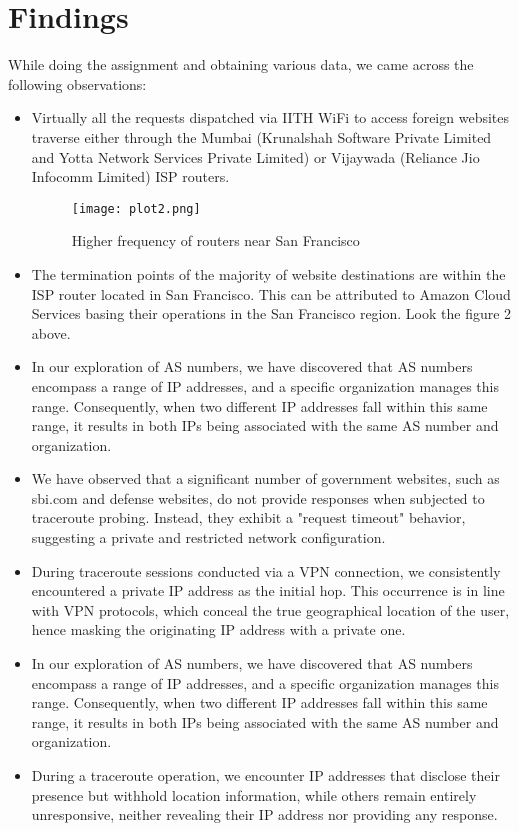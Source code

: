 \documentclass{article}
\begin{document}
\section{Findings}
While doing the assignment and obtaining various data, we came across the following observations:
\begin{itemize}
\item Virtually all the requests dispatched via IITH WiFi to access foreign websites traverse either through the Mumbai (Krunalshah Software Private Limited and Yotta Network Services Private Limited) or Vijaywada (Reliance Jio Infocomm Limited) ISP routers.
\begin{figure}[htbp]
    \centering
    \texttt{[image: plot2.png]}
    \caption{Higher frequency of routers near San Francisco}
    \label{fig:visualization}
\end{figure}
\item The termination points of the majority of website destinations are within the ISP router located in San Francisco. This can be attributed to Amazon Cloud Services basing their operations in the San Francisco region. Look the figure 2 above.

\item In our exploration of AS numbers, we have discovered that AS numbers encompass a range of IP addresses, and a specific organization manages this range. Consequently, when two different IP addresses fall within this same range, it results in both IPs being associated with the same AS number and organization.

\item We have observed that a significant number of government websites, such as sbi.com and defense websites, do not provide responses when subjected to traceroute probing. Instead, they exhibit a "request timeout" behavior, suggesting a private and restricted network configuration.
\item During traceroute sessions conducted via a VPN connection, we consistently encountered a private IP address as the initial hop. This occurrence is in line with VPN protocols, which conceal the true geographical location of the user, hence masking the originating IP address with a private one.
\item In our exploration of AS numbers, we have discovered that AS numbers encompass a range of IP addresses, and a specific organization manages this range. Consequently, when two different IP addresses fall within this same range, it results in both IPs being associated with the same AS number and organization.
\item During a traceroute operation, we encounter IP addresses that disclose their presence but withhold location information, while others remain entirely unresponsive, neither revealing their IP address nor providing any response.
\end{itemize}
\end{document}

